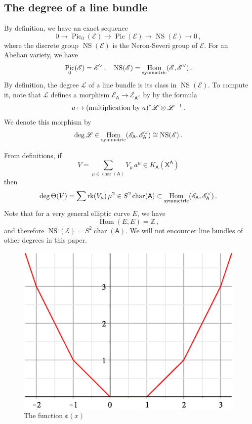 \documentclass[14pt]{extarticle}
\newcommand{\Z}{\mathbb{Z}}
\newcommand{\bA}{\mathsf{A}}
\newcommand{\bX}{\mathsf{X}}
\newcommand{\cL}{\mathscr{L}}
\newcommand{\cE}{\mathscr{E}}
\newcommand{\Qq}{\mathbb{q}}
\DeclareMathOperator{\Hom}{Hom}
\DeclareMathOperator{\cha}{char}
\DeclareMathOperator{\rk}{rk}
\DeclareMathOperator{\Pic}{Pic}
\DeclareMathOperator{\NS}{NS}
\theoremstyle{definition}
\begin{document}
  \subsection{The degree of a line bundle} \label{A_degree}

  By definition, we have an exact sequence
  $$
  0 \to \Pic_0(\cE)  \to \Pic(\cE) \to \NS(\cE) \to 0\,, 
  $$
  where the discrete group $\NS(\cE)$ is  the Neron-Severi group of
  $\cE$.  For an Abelian variety, we have
  $$
  \Pic_0(\cE) = \cE^\vee\,, \quad \NS(\cE) = \Hom_{\textup{symmetric}}(\cE,\cE^\vee)  \,.
  $$
By definition, the degree $\cL$ of a line bundle is its class in
  $\NS(\cE)$.  To compute it, note that 
  $\cL$ defines a morphism $\cE_\bA \to
  \cE_{\bA^\vee}$ by 
  by the formula
  $$
  a \mapsto (\textup{multiplication by $a$})^* \cL \otimes \cL^{-1}
\,. 
$$ 
We denote this morphism by
$$
\deg \cL \in \Hom_{\textup{symmetric}}(\cE_\bA, \cE_\bA^\vee) \cong
\NS(\cE) \,. 
$$

{} From definitions, if
$$
V = \sum_{\mu \in \cha(\bA)} V_\mu \, a^\mu \in K_{\bA}(\bX^\bA)
$$
then 
%
\begin{equation}
\deg \Theta(V)
= \sum \rk(V_{\mu}) \, \mu^2 \in S^2 \cha(\bA) \subset
\Hom_{\textup{symmetric}}(\cE_\bA, \cE_\bA^\vee) \,.\label{degThV2}
\end{equation}
%
Note that for a very general elliptic curve $E$, we have
$$
\Hom(E,E) = \Z \,,
$$
and therefore $\NS(\cE) =  S^2\cha(\bA)$. We will not encounter line
bundles of other degrees in this paper. 


%
\begin{figure}[!h]
  \centering
   \includegraphics[scale=0.4]{ese_note_figure1.eps}
 \caption{The function $\Qq(x)$}
\label{f1}
\end{figure}
%
\end{document}
